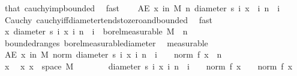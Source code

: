 \begin{isabellebody}
\ that\ cauchy{\isacharunderscore}{\kern0pt}imp{\isacharunderscore}{\kern0pt}bounded\ \isamarkupfalse%
\ fast\isanewline
\isanewline
\ \ \isamarkupfalse%
\ {\isachardoublequoteopen}AE\ x\ in\ M{\isachardot}{\kern0pt}\ {\isacharparenleft}{\kern0pt}{\isasymlambda}n{\isachardot}{\kern0pt}\ diameter\ {\isacharbraceleft}{\kern0pt}s\ i\ x\ {\isacharbar}{\kern0pt}\ i{\isachardot}{\kern0pt}\ n\ {\isasymle}\ i{\isacharbraceright}{\kern0pt}{\isacharparenright}{\kern0pt}\ {\isasymlonglonglongrightarrow}\ {}{\isachardoublequoteclose}\ \isamarkupfalse%
\ Cauchy\ cauchy{\isacharunderscore}{\kern0pt}iff{\isacharunderscore}{\kern0pt}diameter{\isacharunderscore}{\kern0pt}tends{\isacharunderscore}{\kern0pt}to{\isacharunderscore}{\kern0pt}zero{\isacharunderscore}{\kern0pt}and{\isacharunderscore}{\kern0pt}bounded\ \isamarkupfalse%
\ fast\isanewline
\ \ \isamarkupfalse%
\ \isamarkupfalse%
\ {\isachardoublequoteopen}{\isacharparenleft}{\kern0pt}{\isasymlambda}x{\isachardot}{\kern0pt}\ diameter\ {\isacharbraceleft}{\kern0pt}s\ i\ x\ {\isacharbar}{\kern0pt}i{\isachardot}{\kern0pt}\ n\ {\isasymle}\ i{\isacharbraceright}{\kern0pt}{\isacharparenright}{\kern0pt}\ {\isasymin}\ borel{\isacharunderscore}{\kern0pt}measurable\ M{\isachardoublequoteclose}\ \ n\ \isamarkupfalse%
\ bounded{\isacharunderscore}{\kern0pt}range{\isacharunderscore}{\kern0pt}s\ borel{\isacharunderscore}{\kern0pt}measurable{\isacharunderscore}{\kern0pt}diameter\ \isamarkupfalse%
\ measurable\isanewline
\ \ \isamarkupfalse%
\ \isamarkupfalse%
\ {\isachardoublequoteopen}AE\ x\ in\ M{\isachardot}{\kern0pt}\ norm\ {\isacharparenleft}{\kern0pt}diameter\ {\isacharbraceleft}{\kern0pt}s\ i\ x\ {\isacharbar}{\kern0pt}i{\isachardot}{\kern0pt}\ n\ {\isasymle}\ i{\isacharbraceright}{\kern0pt}{\isacharparenright}{\kern0pt}\ {\isasymle}\ {}\ {\isacharasterisk}{\kern0pt}\ norm\ {\isacharparenleft}{\kern0pt}f\ x{\isacharparenright}{\kern0pt}{\isachardoublequoteclose}\ \ n\isanewline
\ \ \isamarkupfalse%
\ {\isacharminus}{\kern0pt}\ \isanewline
\ \ \ \ \isacommand{{\isacharbraceleft}{\kern0pt}}\isamarkupfalse%
\isanewline
\ \ \ \ \ \ \isamarkupfalse%
\ x\ \isamarkupfalse%
\ x{\isacharcolon}{\kern0pt}\ {\isachardoublequoteopen}x\ {\isasymin}\ space\ M{\isachardoublequoteclose}\isanewline
\ \ \ \ \ \ \isamarkupfalse%
\ {\isachardoublequoteopen}diameter\ {\isacharbraceleft}{\kern0pt}s\ i\ x\ {\isacharbar}{\kern0pt}i{\isachardot}{\kern0pt}\ n\ {\isasymle}\ i{\isacharbraceright}{\kern0pt}\ {\isasymle}\ {}\ {\isacharasterisk}{\kern0pt}\ norm\ {\isacharparenleft}{\kern0pt}f\ x{\isacharparenright}{\kern0pt}\ {\isacharplus}{\kern0pt}\ {}\ {\isacharasterisk}{\kern0pt}\ norm\ {\isacharparenleft}{\kern0pt}f\ x{\isacharparenright}{\kern0pt}{\isachardoublequoteclose}\ \isamarkupfalse%

\end{isabellebody}
